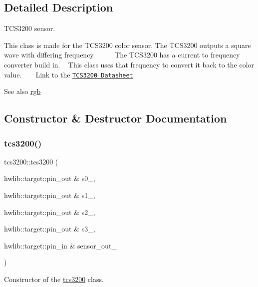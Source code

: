 \subsection{Detailed Description}
T\+C\+S3200 sensor. 

This class is made for the T\+C\+S3200 color sensor. The T\+C\+S3200 outputs a square wave with differing frequency. ~\newline
  ~\newline
  ~\newline
 The T\+C\+S3200 has a current to frequency converter build in. ~\newline
 This class uses that frequency to convert it back to the color value. ~\newline
 ~\newline
 Link to the \href{https://www.mouser.com/catalog/specsheets/tcs3200-e11.pdf}{\tt T\+C\+S3200 Datasheet} \begin{DoxySeeAlso}{See also}
\hyperlink{structrgb}{rgb} 
\end{DoxySeeAlso}


\subsection{Constructor \& Destructor Documentation}
\mbox{\label{classtcs3200_a13e30ee8c4783f1db994fc2cb67e66f3}} 
\subsubsection{\texorpdfstring{tcs3200()}{tcs3200()}}
{\footnotesize\ttfamily tcs3200\+::tcs3200 (\begin{DoxyParamCaption}\item[{hwlib\+::target\+::pin\+\_\+out \&}]{s0\+\_\+,  }\item[{hwlib\+::target\+::pin\+\_\+out \&}]{s1\+\_\+,  }\item[{hwlib\+::target\+::pin\+\_\+out \&}]{s2\+\_\+,  }\item[{hwlib\+::target\+::pin\+\_\+out \&}]{s3\+\_\+,  }\item[{hwlib\+::target\+::pin\+\_\+in \&}]{sensor\+\_\+out\+\_\+ }\end{DoxyParamCaption})\hspace{0.3cm}{\ttfamily [inline]}}



Constructor of the \hyperlink{classtcs3200}{tcs3200} class. 


